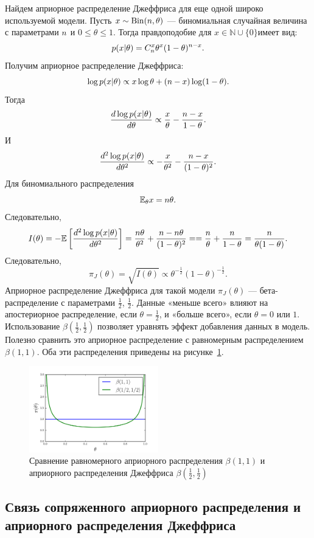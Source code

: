 \begin{example}
Найдем априорное распределение Джеффриса для еще одной широко используемой модели.
Пусть $x \sim \mathrm{Bin}(n, \theta)$ --- биномиальная случайная величина с параметрами $n$ и $0 \leq \theta \leq 1$.
Тогда правдоподобие для $x \in \mathbb{N} \cup \{0\}$имеет вид:
\[
p(x | \theta) = C_{n}^x \theta^x (1- \theta)^{n - x}.
\]
Получим априорное распределение Джеффриса:
\[
\log p(x | \theta) \propto x \log \theta + (n - x) \log(1 - \theta).
\]
Тогда 
\[
\frac{ d \log p(x | \theta)}{d \theta} \propto \frac{x}{\theta} - \frac{n - x}{1 - \theta}.
\]
И
\[
\frac{ d^2 \log p(x | \theta)}{d \theta^2} \propto -\frac{x}{\theta^2} - \frac{n - x}{(1 - \theta)^2}.
\]
Для биномиального распределения
\[
\mathbb{E}_\theta x = n \theta.
\]
Следовательно,
\[
I(\theta) = -\mathbb{E} \left[\frac{d^2 \log p(x | \theta)}{d \theta^2} \right] = \frac{n \theta}{\theta^2} + \frac{n - n\theta}{(1 - \theta)^2} =
= \frac{n}{\theta} + \frac{n}{1 - \theta} = \frac{n}{\theta (1 - \theta)}.
\]
Следовательно,
\[
\pi_J(\theta) = \sqrt{I(\theta)} \propto \theta^{-\frac12} (1 - \theta)^{-\frac12}.
\]
Априорное распределение Джеффриса для такой модели $\pi_J(\theta)$ --- бета-распределение с параметрами $\frac12$, $\frac12$.
Данные «меньше всего» влияют на апостериорное распределение, если $\theta = \frac12$, 
и «больше всего», если $\theta = 0$ или $1$.
Использование $\beta(\frac12, \frac12)$ позволяет уравнять эффект добавления данных в модель.
Полезно сравнить это априорное распределение с равномерным распределением $\beta(1, 1)$.
Оба эти распределения приведены на рисунке~\ref{fig:beta_comparison}.

\begin{figure}
\centering
\includegraphics[width=0.5\textwidth]{figures/beta_comparison.png}
\caption{Сравнение равномерного априорного распределения $\beta(1, 1)$ и априорного распределения Джеффриса $\beta(\frac12, \frac12)$}
\label{fig:beta_comparison}
\end{figure}
\end{example}

\subsection{Связь сопряженного априорного распределения и априорного распределения Джеффриса}

